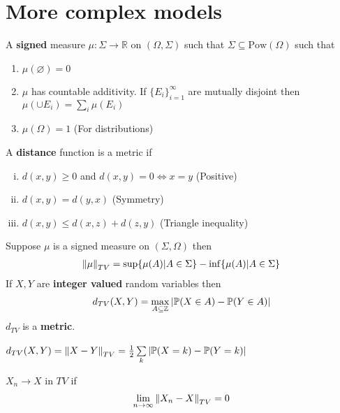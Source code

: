 \documentclass[12pt,a4paper]{article}
\begin{document}
\section{More complex models}
\begin{defn}[Measure]
    A \textbf{signed} measure $\mu : \Sigma \to \mathbb{R}$ on $(\Omega, \Sigma)$ such that
    $\Sigma \subseteq \mathrm{Pow}(\Omega)$ such that 
    \begin{enumerate}[(1)]
        \item $\mu(\varnothing) = 0$
        \item $\mu$ has countable additivity. If $\{E_i\}_{i=1}^\infty$ are mutually disjoint then $\mu(\cup E_i) = \sum_i \mu(E_i)$
        \item $\mu(\Omega) = 1$ (For distributions)
    \end{enumerate}
\end{defn}
\begin{defn}[Metric]
    A \textbf{distance} function is a metric if
    \begin{enumerate}[(i)]
        \item $d(x,y) \geq 0$ and $d(x,y) = 0 \iff x = y$ (Positive)
        \item $d(x,y) = d(y,x)$ (Symmetry)
        \item $d(x,y) \leq d(x,z) + d(z,y)$ (Triangle inequality)
    \end{enumerate}

\end{defn}
\begin{defn}
    Suppose $\mu$ is a signed measure on $(\Sigma, \Omega)$ then 
    \begin{align*}
        \norm{\mu}_{TV} = \sup\{\mu(A) | A\in \Sigma\} - \inf\{\mu(A) | A\in \Sigma\}
    \end{align*}
    If $X,Y$ are \textbf{integer valued} random variables then
    \begin{align*}
        d_{TV}(X,Y) = \max_{A\subseteq \mathbb{Z}}|\P(X\in A) - \P(Y\in A)|
    \end{align*}
    $d_{TV}$ is a \textbf{metric}.
\end{defn}
\begin{remark}
    $d_{TV}(X,Y) = \norm{X-Y}_{TV} = \frac{1}{2}\nsum{k}{} |\P(X=k) - \P(Y=k)|$
\end{remark}
\begin{defn}
    $X_n \to X$ in $TV$ if 
    \begin{align*}
        \nlim{n}{\infty} \norm{X_n - X}_{TV} = 0
    \end{align*}
\end{defn}
\end{document}
